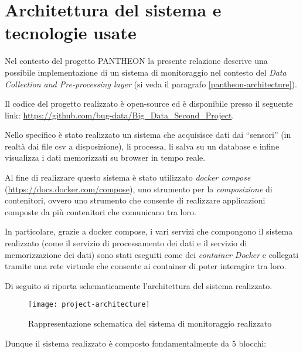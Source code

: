 \section{Architettura del sistema e tecnologie usate}
Nel contesto del progetto PANTHEON la presente relazione descrive una possibile implementazione di un sistema di monitoraggio nel contesto del \textit{Data Collection and Pre-processing layer} (si veda il paragrafo \ref{pantheon-architecture}).\par

Il codice del progetto realizzato è open-source ed è disponibile presso il seguente link: \url{https://github.com/bug-data/Big_Data_Second_Project}.\par

Nello specifico è stato realizzato un sistema che acquisisce dati dai ``sensori'' (in realtà dai file csv a disposizione), li processa, li salva su un database e infine visualizza i dati memorizzati su browser in tempo reale.\par

Al fine di realizzare questo sistema è stato utilizzato \textit{docker compose} \\
(\url{https://docs.docker.com/compose}), uno strumento per la \textit{composizione} di contenitori, ovvero uno strumento che consente di realizzare applicazioni composte da più contenitori che comunicano tra loro.\par

In particolare, grazie a docker compose, i vari servizi che compongono il sistema realizzato (come il servizio di processamento dei dati e il servizio di memorizzazione dei dati) sono stati eseguiti come dei \textit{container Docker} e collegati tramite una rete virtuale che consente ai container di poter interagire tra loro.\par

Di seguito si riporta schematicamente l'architettura del sistema realizzato.

\begin{figure}[ht]
\centering
\texttt{[image: project-architecture]}
\caption{Rappresentazione schematica del sistema di monitoraggio realizzato}
\label{fig:project-architecture}
\end{figure}

Dunque il sistema realizzato è composto fondamentalmente da 5 blocchi:

